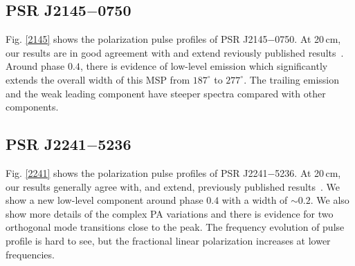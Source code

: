 \documentclass[useAMS,usenatbib]{mn2e}
\begin{document}
\begin{appendix}
\subsection{PSR J2145$-$0750}

Fig. \ref{2145} shows the polarization pulse profiles of 
PSR J2145$-$0750.
%
At 20\,cm, our results are in good agreement with and extend reviously 
published results~\citep{Yan11}.
%
Around phase $0.4$, there is evidence of low-level emission which 
significantly extends the overall width of this MSP from $187^{\circ}$ to 
$277^{\circ}$.
%
The trailing emission and the weak leading component have steeper spectra 
compared with other components.

\subsection{PSR J2241$-$5236}

Fig. \ref{2241} shows the polarization pulse profiles of 
PSR J2241$-$5236.
%
At 20\,cm, our results generally agree with, and extend, previously published 
results~\citep{Keith11}.
%
We show a new low-level component around phase $0.4$ with a width of $\sim 0.2$.
%
We also show more details of the complex PA variations and there is evidence 
for two orthogonal mode transitions close to the peak.
%
The frequency evolution of pulse profile is hard to see, but the fractional 
linear polarization increases at lower frequencies.


\end{appendix}
\end{document}
